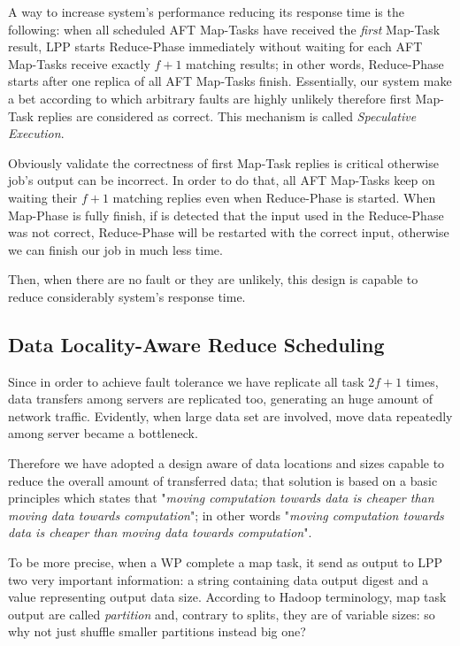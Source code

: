 \documentclass[sigchi]{acmart}
\begin{document}
A way to increase system's performance reducing its response time is the following: when all scheduled AFT Map-Tasks have received the \textit{first} Map-Task result, LPP starts Reduce-Phase immediately without waiting for each AFT Map-Tasks receive exactly $f + 1$ matching results; in other words, Reduce-Phase starts after one replica of all AFT Map-Tasks finish. Essentially, our system make a bet according to which arbitrary faults are highly unlikely therefore first Map-Task replies are considered as correct. This mechanism is called \textit{Speculative Execution}.

Obviously validate the correctness of first Map-Task replies is critical otherwise job's output can be incorrect. In order to do that, all AFT Map-Tasks keep on waiting their $f + 1$ matching replies even when Reduce-Phase is started. When Map-Phase is fully finish, if is detected that the input used in the Reduce-Phase was not correct, Reduce-Phase will be restarted with the correct input, otherwise we can finish our job in much less time.

Then, when there are no fault or they are unlikely, this design is capable to reduce considerably system's response time. 

\subsection{Data Locality-Aware Reduce Scheduling}

Since in order to achieve fault tolerance we have replicate all task $2f + 1$ times, data transfers among servers are replicated too, generating an huge amount of network traffic. Evidently, when large data set are involved, move data repeatedly among server became a bottleneck.

Therefore we have adopted a design aware of data locations and sizes capable to reduce the overall amount of transferred data; that solution is based on a basic principles which states that "\textit{moving computation towards data is cheaper than moving data towards computation}"; in other words  "\textit{moving computation towards data is cheaper than moving data towards computation}".

To be more precise, when a WP complete a map task, it send as output to LPP two very important information: a string containing data output digest and a value representing output data size. According to Hadoop terminology, map task output are called \textit{partition} and, contrary to splits, they are of variable sizes: so why not just shuffle smaller partitions instead big one? 
\end{document}
